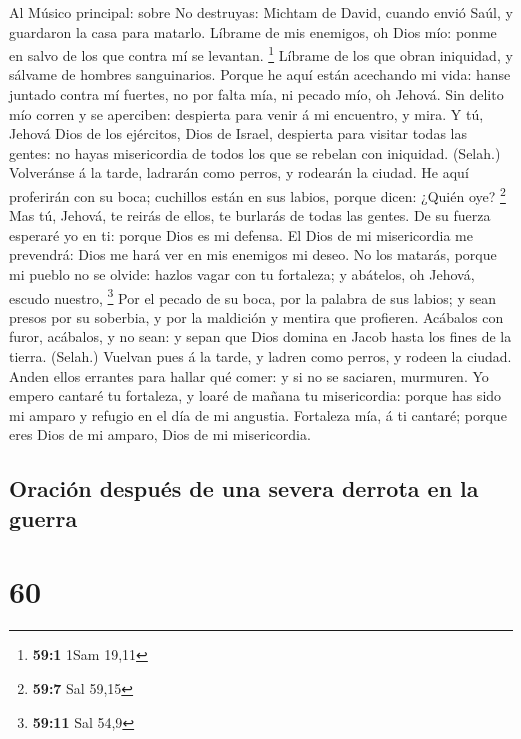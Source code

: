  Al Músico principal: sobre No destruyas: Michtam de David,
cuando envió Saúl, y guardaron la casa para matarlo. Líbrame de mis
enemigos, oh Dios mío: ponme en salvo de los que contra mí se levantan.
\footnote{\textbf{59:1} 1Sam 19,11}  Líbrame de los que
obran iniquidad, y sálvame de hombres sanguinarios.  Porque
he aquí están acechando mi vida: hanse juntado contra mí fuertes, no por
falta mía, ni pecado mío, oh Jehová.  Sin delito mío corren
y se aperciben: despierta para venir á mi encuentro, y mira.
 Y tú, Jehová Dios de los ejércitos, Dios de Israel,
despierta para visitar todas las gentes: no hayas misericordia de todos
los que se rebelan con iniquidad. (Selah.)  Volveránse á la
tarde, ladrarán como perros, y rodearán la ciudad.  He aquí
proferirán con su boca; cuchillos están en sus labios, porque dicen:
¿Quién oye? \footnote{\textbf{59:7} Sal 59,15}  Mas tú,
Jehová, te reirás de ellos, te burlarás de todas las gentes.
 De su fuerza esperaré yo en ti: porque Dios es mi defensa.
 El Dios de mi misericordia me prevendrá: Dios me hará ver
en mis enemigos mi deseo.  No los matarás, porque mi pueblo
no se olvide: hazlos vagar con tu fortaleza; y abátelos, oh Jehová,
escudo nuestro, \footnote{\textbf{59:11} Sal 54,9}  Por el
pecado de su boca, por la palabra de sus labios; y sean presos por su
soberbia, y por la maldición y mentira que profieren. 
Acábalos con furor, acábalos, y no sean: y sepan que Dios domina en
Jacob hasta los fines de la tierra. (Selah.)  Vuelvan pues
á la tarde, y ladren como perros, y rodeen la ciudad. 
Anden ellos errantes para hallar qué comer: y si no se saciaren,
murmuren.  Yo empero cantaré tu fortaleza, y loaré de
mañana tu misericordia: porque has sido mi amparo y refugio en el día de
mi angustia.  Fortaleza mía, á ti cantaré; porque eres Dios
de mi amparo, Dios de mi misericordia.

\hypertarget{oraciuxf3n-despuuxe9s-de-una-severa-derrota-en-la-guerra}{%
\subsection{Oración después de una severa derrota en la
guerra}\label{oraciuxf3n-despuuxe9s-de-una-severa-derrota-en-la-guerra}}

\hypertarget{section-59}{%
\section{60}\label{section-59}}

